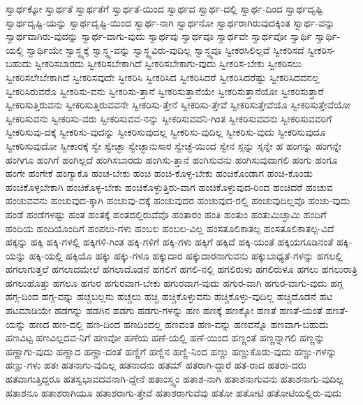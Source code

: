 {ಸ್ವಾರ್ಥಕ್ಕೋ
ಸ್ವಾರ್ಥತೆ
ಸ್ವಾರ್ಥತೆಗೆ
ಸ್ವಾರ್ಥತೆ-ಯಿಂದ
ಸ್ವಾರ್ಥದ
ಸ್ವಾರ್ಥ-ದಲ್ಲಿ
ಸ್ವಾರ್ಥ-ದಿಂದ
ಸ್ವಾರ್ಥದೃಷ್ಟಿ
ಸ್ವಾರ್ಥದೃಷ್ಟಿ-ಯನ್ನು
ಸ್ವಾರ್ಥದೃಷ್ಟಿ-ಯಿಂದ
ಸ್ವಾರ್ಥ-ನಾಗಿ
ಸ್ವಾರ್ಥನೋ
ಸ್ವಾರ್ಥರಾಗಿರುವುದಕ್ಕಿಂತ
ಸ್ವಾರ್ಥ-ವನ್ನು
ಸ್ವಾರ್ಥವಾಗಿರು-ವುದನ್ನು
ಸ್ವಾರ್ಥ-ವಾಗು-ವುದು
ಸ್ವಾರ್ಥವು
ಸ್ವಾರ್ಥವೂ
ಸ್ವಾರ್ಥವೇ
ಸ್ವಾರ್ಥವೋ
ಸ್ವಾರ್ಥಿ
ಸ್ವಾರ್ಥಿ-ಯಲ್ಲಿ
ಸ್ವಾರ್ಥಿಯೇ
ಸ್ವಾಸ್ಥ್ಯಕ್ಕೆ
ಸ್ವಾಸ್ಥ್ಯ-ವನ್ನು
ಸ್ವಾಸ್ಥ್ಯವಿರು-ವುದಿಲ್ಲ
ಸ್ವಾಸ್ಥ್ಯವೂ
ಸ್ವೀಕರಸಿಲಿಲ್ಲವೆ
ಸ್ವೀಕರಿಸದೆ
ಸ್ವೀಕರಿಸ-ಬಹುದು
ಸ್ವೀಕರಿಸಬಾರದು
ಸ್ವೀಕರಿಸಬೇಕಾಗಿದೆ
ಸ್ವೀಕರಿಸಬೇಕಾಗು-ವುದು
ಸ್ವೀಕರಿಸ-ಬೇಕು
ಸ್ವೀಕರಿಸಲು
ಸ್ವೀಕರಿಸಲೇಬೇಕಾಗಿದೆ
ಸ್ವೀಕರಿಸವುದೇ
ಸ್ವೀಕರಿಸಿ
ಸ್ವೀಕರಿಸಿದ
ಸ್ವೀಕರಿಸಿದರೆ
ಸ್ವೀಕರಿಸಿದರೆಷ್ಟು
ಸ್ವೀಕರಿಸಿದವನಲ್ಲ
ಸ್ವೀಕರಿಸಿರುವರೊ
ಸ್ವೀಕರಿಸು-ವನು
ಸ್ವೀಕರಿಸು-ತ್ತಾನೆ
ಸ್ವೀಕರಿಸುತ್ತಾನೆಯೇ
ಸ್ವೀಕರಿಸುತ್ತಾನೆಯೋ
ಸ್ವೀಕರಿಸುತ್ತಾರೆ
ಸ್ವೀಕರಿಸುತ್ತಿರುವನು
ಸ್ವೀಕರಿಸುತ್ತಿರುವವನೇ
ಸ್ವೀಕರಿಸು-ತ್ತೇನೆ
ಸ್ವೀಕರಿಸು-ತ್ತೇವೆ
ಸ್ವೀಕರಿಸುತ್ತೇವೆಯೊ
ಸ್ವೀಕರಿಸುತ್ತೇವೆಯೋ
ಸ್ವೀಕರಿಸುವನು
ಸ್ವೀಕರಿಸು-ವರು
ಸ್ವೀಕರಿಸುವವ-ನನ್ನು
ಸ್ವೀಕರಿಸುವವನಿ-ಗಿಂತ
ಸ್ವೀಕರಿಸುವವನು
ಸ್ವೀಕರಿಸುವವರಿಗೆ
ಸ್ವೀಕರಿಸುವು-ದಕ್ಕೆ
ಸ್ವೀಕರಿಸು-ವುದನ್ನು
ಸ್ವೀಕರಿಸುವುದಲ್ಲ
ಸ್ವೀಕರಿಸು-ವುದಿಲ್ಲ
ಸ್ವೀಕರಿಸು-ವುದು
ಸ್ವೀಕರಿಸುವುದೂ
ಸ್ವೀಕರಿಸುವುದೋ
ಸ್ವೀಕಾರಕ್ಕೆ
ಸ್ವೇ
ಸ್ವೇಚ್ಛಾ
ಸ್ವೇಚ್ಛಾನುಸಾರ
ಸ್ವೇಚ್ಛೆ-ಯಿಂದ
ಸ್ವೇನ
ಸ್ಸನ್ನು
ಸ್ಸನ್ನೇ
ಹ
ಹಂಗನ್ನು
ಹಂಗನ್ನೇ
ಹಂಗಿಗೂ
ಹಂಗಿಗೆ
ಹಂಗಿಲ್ಲದೆ
ಹಂಗಿಸಬಾರದು
ಹಂಗಿಸು-ತ್ತಾನೆ
ಹಂಗಿಸುವನು
ಹಂಗಿಸುವುದಾಗಲಿ
ಹಂಗು
ಹಂಗೂ
ಹಂಗೇ
ಹಂಗೇಕೆ
ಹಂಗ್ಯಾಕೊ
ಹಂಚ-ಬೇಕು
ಹಂಚಿ
ಹಂಚಿ-ಕೊಳ್ಳ-ಬೇಕು
ಹಂಚಿಕೊಂಡಾಗ
ಹಂಚಿ-ಕೊಂಡು
ಹಂಚಿಕೊಳ್ಳಬೇಕಾಗಿ
ಹಂಚಿಕೊಳ್ಳ-ಬೇಕು
ಹಂಚಿಕೊಳ್ಳುತ್ತಿರು-ವಾಗ
ಹಂಚಿಕೊಳ್ಳುವುದ-ರಿಂದ
ಹಂಚಿದರೆ
ಹಂಚುವ
ಹಂಚುವವನು
ಹಂಚುವುದ-ಕ್ಕಾಗಿ
ಹಂಚುವು-ದಕ್ಕೆ
ಹಂಚುವುದರ
ಹಂಚುವುದ-ರಲ್ಲಿ
ಹಂಚುವುದಿಲ್ಲವೊ
ಹಂಚು-ವುದು
ಹಂಡೆ
ಹಂಡೆಗಳಷ್ಟು
ಹಂತ
ಹಂತಕ್ಕೆ
ಹಂತದಲ್ಲಿರುವೆವೊ
ಹಂತಾರಂ
ಹಂತಿ
ಹಂತುಂ
ಹಂತುಮಿಚ್ಛಾಮಿ
ಹಂದಿಗೆ
ಹಂದಿಯ
ಹಂದಿಯೊಂದಿಗೆ
ಹಂಪಲು-ಗಳು
ಹಂಬಲ
ಹಂಬಲ-ವಿಲ್ಲ
ಹಂಸತೂಲಿಕಾತಲ್ಪ
ಹಂಸತೂಲಿಕಾತಲ್ಪ-ವಿದೆ
ಹಕ್ಕನ್ನು
ಹಕ್ಕಿ
ಹಕ್ಕಿ-ಗಳಲ್ಲಿ
ಹಕ್ಕಿಗಳಿ-ಗಿಂತ
ಹಕ್ಕಿ-ಗಳಿಗೆ
ಹಕ್ಕಿ-ಗಳು
ಹಕ್ಕಿಗೆ
ಹಕ್ಕಿದೆ
ಹಕ್ಕಿ-ಯಂತೆ
ಹಕ್ಕಿಯಗೂಡಿನಂತೆ
ಹಕ್ಕಿ-ಯನ್ನು
ಹಕ್ಕಿ-ಯಲ್ಲಿ
ಹಕ್ಕಿಯೊ
ಹಕ್ಕು
ಹಕ್ಕು-ಗಳೂ
ಹಕ್ಕುದಾರ
ಹಕ್ಕುದಾರನಾಗುವನು
ಹಕ್ಕುಬಾಧ್ಯತೆ-ಗಳನ್ನು
ಹಗಲಲ್ಲಿ
ಹಗಲಾಗುತ್ತಲೆ
ಹಗಲಾದಮೇಲೆ
ಹಗಲಾದೊಡನೆ
ಹಗಲಿಗೆ
ಹಗಲಿ-ನಲ್ಲಿ
ಹಗಲಿರುಳು
ಹಗಲಿರುಳೂ
ಹಗಲು
ಹಗಲುರಾತ್ರಿ
ಹಗಲುಹೊತ್ತು
ಹಗಲೂ
ಹಗುರ
ಹಗುರವಾಗ-ಬೇಕು
ಹಗುರವಾಗ-ವುದು
ಹಗುರ-ವಾಗಿ
ಹಗುರ-ವಾಗು-ವುದು
ಹಗ್ಗ
ಹಗ್ಗ-ದಿಂದ
ಹಗ್ಗ-ವನ್ನು
ಹಚ್ಚಬಲ್ಲನು
ಹಚ್ಚಲು
ಹಚ್ಚಿ
ಹಚ್ಚಿಕೊಳ್ಳುವನು
ಹಚ್ಚಿಕೊಳ್ಳು-ವುದಿಲ್ಲ
ಹಚ್ಚಿದೊಡನೆ
ಹಟ
ಹಟಮಾಡಿಯೇ
ಹಡಗನ್ನು
ಹಡಗಿನ
ಹಡಗು
ಹಡಗು-ಗಳನ್ನು
ಹಣ
ಹಣಕ್ಕೆ
ಹಣಕ್ಕೋ
ಹಣತೆ
ಹಣತೆ-ಯಂತೆ
ಹಣತೆ-ಯನ್ನು
ಹಣದ
ಹಣ-ದಲ್ಲಿ
ಹಣ-ದಿಂದ
ಹಣದಿಂದಲ್ಲ
ಹಣವಂತ
ಹಣ-ವನ್ನು
ಹಣವನ್ನೊ
ಹಣವಾಗ-ಬಹುದು
ಹಣವಿಟ್ಟ
ಹಣವಿಲ್ಲದವ-ನಿಗೆ
ಹಣವೋ
ಹಣೆಯ
ಹಣೆ-ಯಲ್ಲಿ
ಹಣೆ-ಯಿಂದ
ಹಣ್ಣಂತೆ
ಹಣ್ಣನ್ನಾಗಲಿ
ಹಣ್ಣನ್ನು
ಹಣ್ಣಾಗು-ವುದು
ಹಣ್ಣಾದ
ಹಣ್ಣಾ-ದಂತೆ
ಹಣ್ಣಿಗೆ
ಹಣ್ಣಿನ
ಹಣ್ಣಿ-ನಿಂದ
ಹಣ್ಣು
ಹಣ್ಣುಕೊಡು-ವುದು
ಹಣ್ಣು-ಗಳನ್ನು
ಹಣ್ಣು-ಗಳು
ಹತಃ
ಹತನಾಗು-ವುದಿಲ್ಲ
ಹತನಾದನು
ಹತಮ್
ಹತರಾಗಿ-ದ್ದಾರೆ
ಹತ-ರಾದ
ಹತರಾ-ದರು
ಹತವಾಗುತ್ತಿದ್ದರೂ
ಹತಸ್ವಭಾವದವನಾಗಿ-ದ್ದೇನೆ
ಹತಾಂಸ್ತ್ವಂ
ಹತಾಶ-ನಾಗಿ
ಹತಾಶನಾಗುವನು
ಹತಾಶನಾಗು-ವುದಿಲ್ಲ
ಹತಾಶನೂ
ಹತಾಶರಾಗಿಯೂ
ಹತಾಶರಾಗು-ತ್ತೇವೆ
ಹತಾಶರಾಗುವೆವು
ಹತೋ
ಹತೋಟಿ
ಹತೋಟಿಯಲ್ಲಿರು-ವುದು
}
